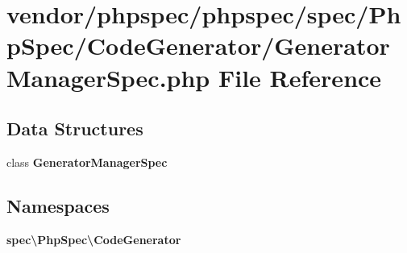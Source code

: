 \section{vendor/phpspec/phpspec/spec/\+Php\+Spec/\+Code\+Generator/\+Generator\+Manager\+Spec.php File Reference}
\label{_generator_manager_spec_8php}
\subsection*{Data Structures}
\begin{DoxyCompactItemize}
\item 
class {\bf Generator\+Manager\+Spec}
\end{DoxyCompactItemize}
\subsection*{Namespaces}
\begin{DoxyCompactItemize}
\item 
 {\bf spec\textbackslash{}\+Php\+Spec\textbackslash{}\+Code\+Generator}
\end{DoxyCompactItemize}
